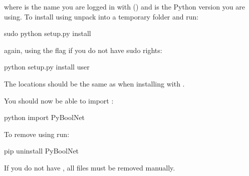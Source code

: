 \documentclass[letterpaper,10pt,english]{sphinxmanual}
\begin{document}
\begin{sphinxVerbatim}[commandchars=\\\{\}]
\end{sphinxVerbatim}

where  is the name you are logged in with () and  is the Python version you are using.
To install  using  unpack  into a temporary folder and run:

\begin{sphinxVerbatim}[commandchars=\\\{\}]
\PYGZdl{} sudo python setup.py install
\end{sphinxVerbatim}

again, using the  flag if you do not have sudo rights:

\begin{sphinxVerbatim}[commandchars=\\\{\}]
\PYGZdl{} python setup.py install \PYGZhy{}\PYGZhy{}user
\end{sphinxVerbatim}

The locations should be the same as when installing with .

You should now be able to import :

\begin{sphinxVerbatim}[commandchars=\\\{\}]
\PYGZdl{} python
\PYGZgt{}\PYGZgt{}\PYGZgt{} import PyBoolNet
\end{sphinxVerbatim}

To remove  using  run:

\begin{sphinxVerbatim}[commandchars=\\\{\}]
\PYGZdl{} pip uninstall PyBoolNet
\end{sphinxVerbatim}

If you do not have , all files must be removed manually.
\end{document}
